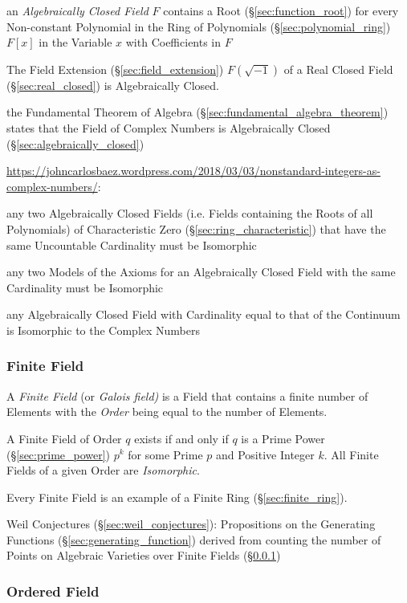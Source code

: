 an \emph{Algebraically Closed Field} $F$ contains a Root
(\S\ref{sec:function_root}) for every Non-constant Polynomial in the Ring of
Polynomials (\S\ref{sec:polynomial_ring}) $F[x]$ in the Variable $x$ with
Coefficients in $F$

The Field Extension (\S\ref{sec:field_extension}) $F(\sqrt{-1})$ of a
Real Closed Field (\S\ref{sec:real_closed}) is Algebraically Closed.

the Fundamental Theorem of Algebra (\S\ref{sec:fundamental_algebra_theorem})
states that the Field of Complex Numbers is Algebraically Closed
(\S\ref{sec:algebraically_closed})

\url{https://johncarlosbaez.wordpress.com/2018/03/03/nonstandard-integers-as-complex-numbers/}:

any two Algebraically Closed Fields (i.e. Fields containing the Roots of all
Polynomials) of Characteristic Zero (\S\ref{sec:ring_characteristic}) that have
the same Uncountable Cardinality must be Isomorphic

any two Models of the Axioms for an Algebraically Closed Field with the same
Cardinality must be Isomorphic

any Algebraically Closed Field with Cardinality equal to that of the Continuum
is Isomorphic to the Complex Numbers



\subsubsection{Finite Field}\label{sec:finite_field}

A \emph{Finite Field} (or \emph{Galois field)} is a Field that contains a
finite number of Elements with the \emph{Order} being equal to the number of
Elements.

A Finite Field of Order $q$ exists if and only if $q$ is a Prime Power
(\S\ref{sec:prime_power}) $p^k$ for some Prime $p$ and Positive Integer $k$.
All Finite Fields of a given Order are \emph{Isomorphic}.

Every Finite Field is an example of a Finite Ring (\S\ref{sec:finite_ring}).

Weil Conjectures (\S\ref{sec:weil_conjectures}): Propositions on the Generating
Functions (\S\ref{sec:generating_function}) derived from counting the number of
Points on Algebraic Varieties over Finite Fields (\S\ref{sec:finite_field})



\subsubsection{Ordered Field}\label{sec:ordered_field}

